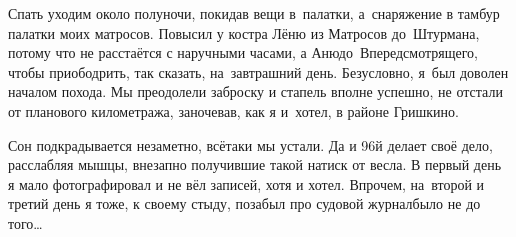 Спать уходим около полуночи, покидав вещи в~палатки, а~снаряжение в тамбур палатки моих матросов. Повысил у костра Лёню из Матросов до~Штурмана, потому что не расстаётся с наручными часами, а Аню\mdash до~Впередсмотрящего, чтобы приободрить, так сказать, на~завтрашний день. Безусловно, я~был доволен началом похода. Мы преодолели заброску и стапель вполне успешно, не отстали от планового километража, заночевав, как я и~хотел, в районе Гришкино.

Сон подкрадывается незаметно, всё\sdash таки мы устали. Да и 96\sdash й делает своё дело, расслабляя мышцы, внезапно получившие такой натиск от весла. В первый день я мало фотографировал и не вёл записей, хотя и хотел. Впрочем, на~второй и третий день я тоже, к своему стыду, позабыл про судовой журнал\mdash было не до того\ldots~

\begin{center}
\end{center}